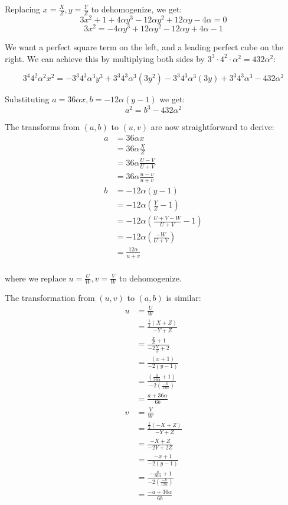\documentclass{article}
\begin{document}
Replacing $x=\frac{X}{Z}, y=\frac{Y}{Z}$ to dehomogenize, we get:
\[  3x^2 + 1 + 4 \alpha y^3 - 12 \alpha y^2 + 12\alpha y - 4\alpha = 0 \]
\[ 3x^2 = -4\alpha y^3 + 12\alpha y^2 -12 \alpha y +4 \alpha -1 \]

We want a perfect square term on the left, and a leading perfect cube on the right. We can achieve
this by multiplying both sides by $3^3\cdot4^2\cdot \alpha^2 = 432\alpha^2$:

\[ 3^4 4^2 \alpha^2 x^2 = -3^3 4^3 \alpha^3 y^3 + 3^3 4^3 \alpha^3 (3y^2) - 3^3 4^3 \alpha^3(3 y) +3^3 4^3 \alpha^3 - 432\alpha^2 \]

Substituting $a=36\alpha x, b=-12\alpha(y-1)$ we get:
\[ a^2 = b^3 - 432\alpha^2 \]

The transforms from $(a,b)$ to $(u,v)$ are now straightforward to derive:
\begin{equation*}
\begin{split}
         a & = 36\alpha x \\
         & = 36 \alpha \frac{X}{Z} \\
         & = 36 \alpha \frac{U-V}{U+V} \\
         & = 36 \alpha \frac{u-v}{u+v} \\
         b & = -12 \alpha (y-1) \\
         & = -12 \alpha \left(\frac{Y}{Z} - 1 \right) \\
         & = -12 \alpha \left(\frac{U+V-W}{U+V} - 1 \right) \\
         & = -12 \alpha \left(\frac{-W}{U+V}\right) \\
         & = \frac{12 \alpha}{u+v} \\
\end{split}
\end{equation*}

where we replace $u=\frac{U}{W}, v=\frac{V}{W}$ to dehomogenize. 

The transformation from $(u,v)$ to $(a,b)$ is similar:
\begin{equation*}
\begin{split}
         u & = \frac{U}{W} \\
         & = \frac{\frac{1}{2}(X + Z)}{-Y + Z} \\
         & = \frac{\frac{X}{Z} + 1}{-2\frac{Y}{Z} + 2} \\
         & = \frac{(x + 1)}{-2(y - 1)} \\
         & = \frac{(\frac{a}{36\alpha} + 1)}{-2\left(\frac{-b}{12\alpha} \right)} \\
         & = \frac{a + 36\alpha}{6b} \\
         v & =  \frac{V}{W} \\
         & = \frac{\frac{1}{2}(-X + Z)}{-Y + Z} \\
         & = \frac{-X + Z}{-2Y + 2Z} \\
         & = \frac{-x + 1}{-2(y -1)} \\
         & = \frac{-\frac{a}{36\alpha} + 1}{-2(\frac{-b}{12\alpha})} \\
         & = \frac{-a + 36\alpha}{6b}
\end{split}
\end{equation*}
\end{document}
